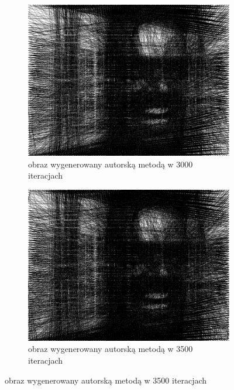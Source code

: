 \begin{figure}[H]
\begin{subfigure}{0.24\textwidth}
        \label{comp-comp-joker-shining-h}
    \end{subfigure}
    \begin{subfigure}{0.24\textwidth}
        \centering
        \includegraphics[width = \textwidth]{img/6-comp/shining_r_i3000_c20_inv0_bg10_obj1_ed1.png}
        \caption{obraz wygenerowany autorską metodą w 3000 iteracjach}
        \label{comp-comp-joker-shining-i}
    \end{subfigure}
    \begin{subfigure}{0.24\textwidth}
        \centering
        \includegraphics[width = \textwidth]{img/6-comp/shining_r_i3500_c20_inv0_bg10_obj1_ed1.png}
        \caption{obraz wygenerowany autorską metodą w 3500 iteracjach}

\end{subfigure}
\end{figure}
